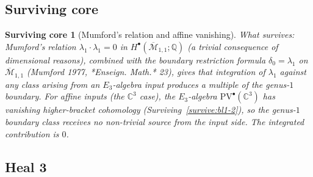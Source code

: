 \documentclass[11pt]{article}
\newtheorem{surviving}[theorem]{Surviving core}
\providecommand{\PVbullet}{\mathrm{PV}^{\bullet}}
\providecommand{\C}{\mathbb{C}}
\providecommand{\QQ}{\mathbb{Q}}
\providecommand{\Mbar}{\overline{\mathcal M}}
\begin{document}
\subsection{Surviving core}
\label{subsec:bl1-survive-3}

\begin{surviving}[Mumford's relation and affine vanishing]
\label{survive:bl1-3}
What survives: Mumford's relation
$\lambda_1 \cdot \lambda_1 = 0$ in $H^\bullet(\Mbar_{1,1}; \QQ)$ (a
trivial consequence of dimensional reasons), combined with the boundary
restriction formula $\delta_0 = \lambda_1$ on $\Mbar_{1,1}$ (Mumford
1977, *Enseign. Math.* 23), gives that integration of $\lambda_1$
against \emph{any} class arising from an $E_3$-algebra input produces
a multiple of the genus-$1$ boundary. For affine inputs (the $\C^3$
case), the $E_3$-algebra $\PVbullet(\C^3)$ has vanishing
higher-bracket cohomology (Surviving~\ref{survive:bl1-2}), so the
genus-$1$ boundary class receives no non-trivial source from the input
side. The integrated contribution is $0$.
\end{surviving}

\subsection{Heal 3}
\label{subsec:bl1-heal-3}
\end{document}
